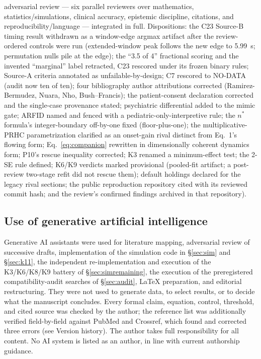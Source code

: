 \documentclass[9pt,twocolumn]{article}
\begin{document}
adversarial review --- six parallel reviewers over mathematics, statistics/simulations, clinical accuracy, epistemic discipline, citations, and reproducibility/language --- integrated in full. Dispositions: the C23 Source-B timing result withdrawn as a window-edge argmax artifact after the review-ordered controls were run (extended-window peak follows the new edge to 5.99~s; permutation nulls pile at the edge); the ``3.5 of 4'' fractional scoring and the invented ``marginal'' label retracted, C23 rescored under its frozen binary rules; Source-A criteria annotated as unfailable-by-design; C7 rescored to NO-DATA (audit now ten of ten); four bibliography author attributions corrected (Ramirez-Bermudez, Nuara, Nho, Bush--Francis); the patient-consent declaration corrected and the single-case provenance stated; psychiatric differential added to the mimic gate; ARFID named and fenced with a pediatric-only-interpretive rule; the $n^{*}$ formula's integer-boundary off-by-one fixed (floor-plus-one); the multiplicative-PRHC parametrization clarified as an onset-gain rival distinct from Eq.~1's flowing form; Eq.~\ref{eq:companion} rewritten in dimensionally coherent dynamics form; P10's rescue inequality corrected; K3 renamed a minimum-effect test; the 2-SE rule defined; K6/K9 verdicts marked provisional (pooled-fit artifact; a post-review two-stage refit did not rescue them); default holdings declared for the legacy rival sections; the public reproduction repository cited with its reviewed commit hash; and the review's confirmed findings archived in that repository).

\subsection*{Use of generative artificial intelligence}
Generative AI assistants were used for literature mapping, adversarial review of successive drafts, implementation of the simulation code in \S\ref{sec:sim} and \S\ref{sec:k11}, the independent re-implementation and execution of the K3/K6/K8/K9 battery of \S\ref{sec:simremaining}, the execution of the preregistered compatibility-audit searches of \S\ref{sec:audit}, LaTeX preparation, and editorial restructuring. They were not used to generate data, to select results, or to decide what the manuscript concludes. Every formal claim, equation, control, threshold, and cited source was checked by the author; the reference list was additionally verified field-by-field against PubMed and Crossref, which found and corrected three errors (see Version history). The author takes full responsibility for all content. No AI system is listed as an author, in line with current authorship guidance.
\end{document}
